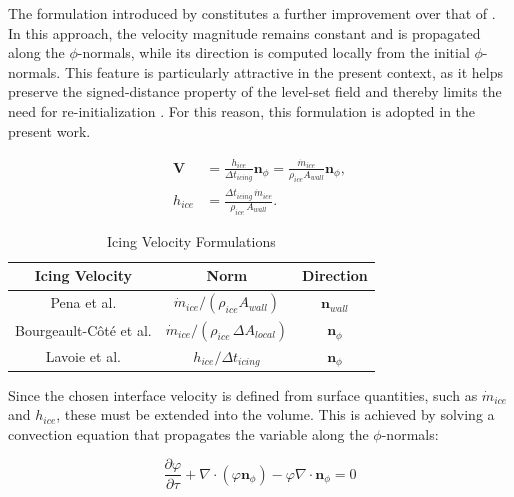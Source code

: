 The formulation introduced by \cite{lavoieLevelSet} constitutes a further improvement over that of \cite{PENA2016278}. In this approach, the velocity magnitude remains constant and is propagated along the $\phi$-normals, while its direction is computed locally from the initial $\phi$-normals. This feature is particularly attractive in the present context, as it helps preserve the signed-distance property of the level-set field and thereby limits the need for re-initialization \cite{FROLKOVIC2015214}. For this reason, this formulation is adopted in the present work.

\begin{equation}
\begin{aligned}
\boldsymbol{V} &= \frac{h_{ice}}{\Delta t_{icing}} \boldsymbol{n}_{\phi}
= \frac{\dot{m}_{ice}}{\rho_{ice} A_{wall}} \boldsymbol{n}_{\phi}, \\
h_{ice} &= \frac{\Delta t_{icing} \, \dot{m}_{ice}}{\rho_{ice} \, A_{wall}}.
\end{aligned}
\label{eq:distanceIcingVelocity}
\end{equation}

\begin{table}[ht]
\centering
\caption{Icing Velocity Formulations}
\begin{tabular}{ccc}
\hline \hline
Icing Velocity & Norm & Direction \\ 
\hline
Pena et al. \cite{PENA2016278} & $\dot{m}_{ice} / (\rho_{ice} A_{wall})$ & $\boldsymbol{n}_{wall}$ \\ 
Bourgeault-Côté et al. \cite{bourgault2019ice} & $\dot{m}_{ice} / (\rho_{ice} \, \Delta A_{local})$ & $\boldsymbol{n}_{\phi}$ \\ 
Lavoie et al. \cite{lavoieLevelSet} & $h_{ice} / \Delta t_{icing}$ & $\boldsymbol{n}_{\phi}$ \\ 
\hline \hline
\end{tabular}
\label{tab:velocityFormulation}
\end{table}

Since the chosen interface velocity is defined from surface quantities, such as $\dot{m}_{ice}$ and $h_{ice}$, these must be extended into the volume. This is achieved by solving a convection equation \cite{bourgault2019ice} that propagates the variable along the $\phi$-normals:

\begin{equation}
\frac{\partial \varphi}{\partial \tau} + \nabla \cdot (\varphi \boldsymbol{n}_{\phi}) - \varphi \nabla \cdot \boldsymbol{n}_{\phi} = 0
\label{eq:propagation}
\end{equation}

